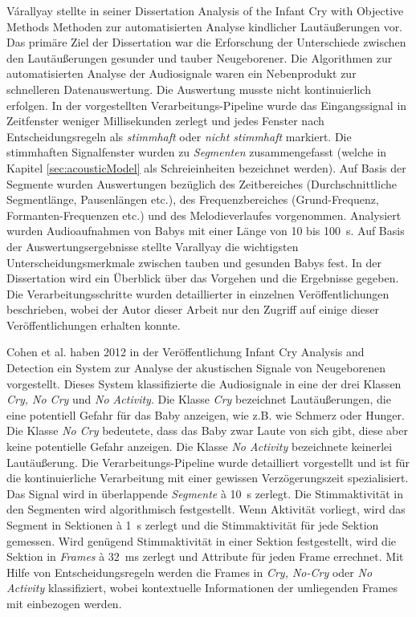 Várallyay stellte in seiner Dissertation \glqq Analysis of the Infant Cry with Objective Methods\grqq{} \cite{cry_thesis} Methoden zur automatisierten Analyse kindlicher Lautäußerungen vor. Das primäre Ziel der Dissertation war die Erforschung der Unterschiede zwischen den Lautäußerungen gesunder und tauber Neugeborener. Die Algorithmen zur automatisierten Analyse der Audiosignale waren ein \glqq Nebenprodukt\grqq{} zur schnelleren Datenauswertung. Die Auswertung musste nicht kontinuierlich erfolgen. In der vorgestellten Verarbeitungs-Pipeline wurde das Eingangssignal in Zeitfenster weniger Millisekunden zerlegt und jedes Fenster nach Entscheidungsregeln als \emph{stimmhaft} oder \emph{nicht stimmhaft} markiert. Die stimmhaften Signalfenster wurden zu \emph{Segmenten} zusammengefasst (welche in Kapitel \ref{sec:acousticModel} als Schreieinheiten bezeichnet werden). Auf Basis der Segmente wurden Auswertungen bezüglich des Zeitbereiches (Durchschnittliche Segmentlänge, Pausenlängen etc.), des Frequenzbereiches (Grund-Frequenz, Formanten-Frequenzen etc.) und des Melodieverlaufes vorgenommen. Analysiert wurden Audioaufnahmen von Babys mit einer Länge von 10 bis \SI{100}{\second}. Auf Basis der Auswertungsergebnisse stellte Varallyay die wichtigsten Unterscheidungsmerkmale zwischen tauben und gesunden Babys fest. In der Dissertation \cite{cry_thesis} wird ein Überblick über das Vorgehen und die Ergebnisse gegeben. Die Verarbeitungsschritte wurden detaillierter in einzelnen Veröffentlichungen beschrieben, wobei der Autor dieser Arbeit nur den Zugriff auf einige dieser Veröffentlichungen erhalten konnte.

Cohen et al. haben 2012 in der Veröffentlichung \glqq Infant Cry Analysis and Detection\grqq{} \cite{cohenCry}  ein System zur Analyse der akustischen Signale von Neugeborenen vorgestellt. Dieses System klassifizierte die Audiosignale in eine der drei Klassen \emph{Cry, No Cry} und \emph{No Activity}. Die Klasse \emph{Cry} bezeichnet Lautäußerungen, die eine potentiell Gefahr für das Baby anzeigen, wie z.B. wie Schmerz oder Hunger. Die Klasse \emph{No Cry} bedeutete, dass das Baby zwar Laute von sich gibt, diese aber keine potentielle Gefahr anzeigen. Die Klasse \emph{No Activity} bezeichnete keinerlei Lautäußerung. Die Verarbeitungs-Pipeline wurde detailliert vorgestellt und ist für die kontinuierliche Verarbeitung mit einer gewissen Verzögerungszeit spezialisiert. Das Signal wird in überlappende \emph{Segmente} \`{a} \SI{10}{\second} zerlegt. Die Stimmaktivität in den Segmenten wird algorithmisch festgestellt. Wenn Aktivität vorliegt, wird das Segment in Sektionen \`{a} \SI{1}{\second} zerlegt und die Stimmaktivität für jede Sektion gemessen. Wird genügend Stimmaktivität in einer Sektion festgestellt, wird die Sektion in \emph{Frames} \`{a} \SI{32}{\milli\second} zerlegt und Attribute für jeden Frame errechnet. Mit Hilfe von Entscheidungsregeln werden die Frames in \emph{Cry, No-Cry} oder \emph{No Activity} klassifiziert, wobei kontextuelle Informationen der umliegenden Frames mit einbezogen werden. 

